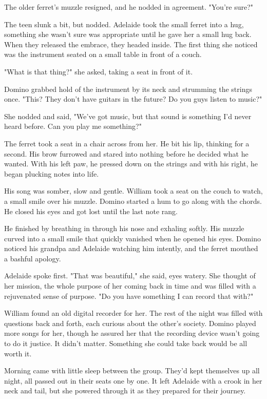 The older ferret's muzzle resigned, and he nodded in agreement. "You're sure?"

The teen slunk a bit, but nodded. Adelaide took the small ferret into a hug, something she wasn't sure was appropriate until he gave her a small hug back. When they released the embrace, they headed inside. The first thing she noticed was the instrument seated on a small table in front of a couch.

"What is that thing?" she asked, taking a seat in front of it.

Domino grabbed hold of the instrument by its neck and strumming the strings once. "This? They don't have guitars in the future? Do you guys listen to music?"

She nodded and said, "We've got music, but that sound is something I'd never heard before. Can you play me something?"

The ferret took a seat in a chair across from her. He bit his lip, thinking for a second. His brow furrowed and stared into nothing before he decided what he wanted. With his left paw, he pressed down on the strings and with his right, he began plucking notes into life.

His song was somber, slow and gentle. William took a seat on the couch to watch, a small smile over his muzzle. Domino started a hum to go along with the chords. He closed his eyes and got lost until the last note rang.

He finished by breathing in through his nose and exhaling softly. His muzzle curved into a small smile that quickly vanished when he opened his eyes. Domino noticed his grandpa and Adelaide watching him intently, and the ferret mouthed a bashful apology.

Adelaide spoke first. "That was beautiful," she said, eyes watery. She thought of her mission, the whole purpose of her coming back in time and was filled with a rejuvenated sense of purpose. "Do you have something I can record that with?"

William found an old digital recorder for her. The rest of the night was filled with questions back and forth, each curious about the other's society. Domino played more songs for her, though he assured her that the recording device wasn't going to do it justice. It didn't matter. Something she could take back would be all worth it.

Morning came with little sleep between the group. They'd kept themselves up all night, all passed out in their seats one by one. It left Adelaide with a crook in her neck and tail, but she powered through it as they prepared for their journey.

